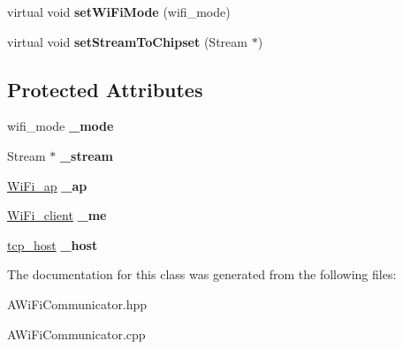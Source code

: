 \begin{DoxyCompactItemize}
\item 
\mbox{\label{classwood_box_1_1communication_1_1wifi_1_1_a_wi_fi_communicator_a813fcffda64d86abfe0316a873f23f54}} 
virtual void {\bfseries set\+Wi\+Fi\+Mode} (wifi\+\_\+mode)
\item 
\mbox{\label{classwood_box_1_1communication_1_1wifi_1_1_a_wi_fi_communicator_a526d2c9ece9000889fd40d9ab98acbdf}} 
virtual void {\bfseries set\+Stream\+To\+Chipset} (Stream $\ast$)
\end{DoxyCompactItemize}
\subsection*{Protected Attributes}
\begin{DoxyCompactItemize}
\item 
\mbox{\label{classwood_box_1_1communication_1_1wifi_1_1_a_wi_fi_communicator_ac07f090eb75730353a78f2d26f2095f1}} 
wifi\+\_\+mode {\bfseries \+\_\+mode}
\item 
\mbox{\label{classwood_box_1_1communication_1_1wifi_1_1_a_wi_fi_communicator_a297970584d8120015f898afa1278eb46}} 
Stream $\ast$ {\bfseries \+\_\+stream}
\item 
\mbox{\label{classwood_box_1_1communication_1_1wifi_1_1_a_wi_fi_communicator_a9d2cdaede0b5e5040867c3d428dd98f0}} 
\mbox{\hyperlink{structs__wifi__access__point}{Wi\+Fi\+\_\+ap}} {\bfseries \+\_\+ap}
\item 
\mbox{\label{classwood_box_1_1communication_1_1wifi_1_1_a_wi_fi_communicator_afde4ef66d5296fbeeff2e1b333105bec}} 
\mbox{\hyperlink{structs__wifi__client}{Wi\+Fi\+\_\+client}} {\bfseries \+\_\+me}
\item 
\mbox{\label{classwood_box_1_1communication_1_1wifi_1_1_a_wi_fi_communicator_a1faaa218eefb367d3d24b6ae83bfe09b}} 
\mbox{\hyperlink{structs__host}{tcp\+\_\+host}} {\bfseries \+\_\+host}
\end{DoxyCompactItemize}


The documentation for this class was generated from the following files\+:\begin{DoxyCompactItemize}
\item 
A\+Wi\+Fi\+Communicator.\+hpp\item 
A\+Wi\+Fi\+Communicator.\+cpp\end{DoxyCompactItemize}
